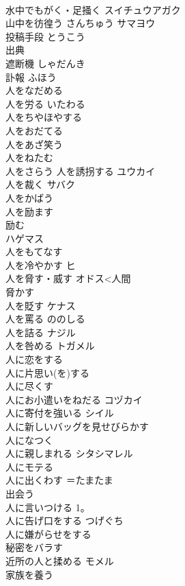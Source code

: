 \documentclass[8pt]{extreport}
\begin{document}
\begin{CJK}{UTF8}{min}
\\	水中でもがく・足掻く	スイチュウアガク 
\\	山中を彷徨う	さんちゅう サマヨウ 
\\	投稿手段	とうこう 
\\	出典	
\\	遮断機	しゃだんき 
\\	訃報	ふほう 
\\	人をなだめる	
\\	人を労る	いたわる 
\\	人をちやほやする	
\\	人をおだてる	
\\	人をあざ笑う	
\\	人をねたむ	
\\	人をさらう 人を誘拐する	ユウカイ 
\\	人を裁く	サバク 
\\	人をかばう	
\\	人を励ます	
\\	励む 
\\	ハゲマス 
\\	人をもてなす	
\\	人を冷やかす	ヒ 
\\	人を脅す・威す	オドス<人間
\\	脅かす
\\	人を貶す	ケナス 
\\	人を罵る	ののしる 
\\	人を詰る	ナジル 
\\	人を咎める	トガメル 
\\	人に恋をする	
\\	人に片思い(を)する	
\\	人に尽くす	
\\	人にお小遣いをねだる	コヅカイ 
\\	人に寄付を強いる	シイル 
\\	人に新しいバッグを見せびらかす	
\\	人になつく	
\\	人に親しまれる	シタシマレル 
\\	人にモテる	
\\	人に出くわす	＝たまたま
\\	出会う 
\\	人に言いつける	1。
\\	人に告げ口をする	つげぐち 
\\	人に嫌がらせをする	
\\	秘密をバラす	
\\	近所の人と揉める	モメル 
\\	家族を養う	

\end{CJK}
\end{document}
